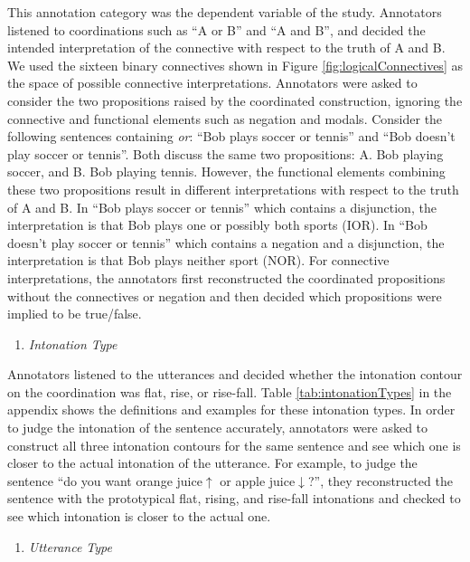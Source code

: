 \documentclass[,man,floatsintext]{apa6}
\providecommand{\tightlist}{%
  \setlength{\itemsep}{0pt}\setlength{\parskip}{0pt}}
\begin{document}
This annotation category was the dependent variable of the study. Annotators listened to coordinations such as \enquote{A or B} and \enquote{A and B}, and decided the intended interpretation of the connective with respect to the truth of A and B. We used the sixteen binary connectives shown in Figure \ref{fig:logicalConnectives} as the space of possible connective interpretations. Annotators were asked to consider the two propositions raised by the coordinated construction, ignoring the connective and functional elements such as negation and modals. Consider the following sentences containing \emph{or}: \enquote{Bob plays soccer or tennis} and \enquote{Bob doesn't play soccer or tennis}. Both discuss the same two propositions: A. Bob playing soccer, and B. Bob playing tennis. However, the functional elements combining these two propositions result in different interpretations with respect to the truth of A and B. In \enquote{Bob plays soccer or tennis} which contains a disjunction, the interpretation is that Bob plays one or possibly both sports (IOR). In \enquote{Bob doesn't play soccer or tennis} which contains a negation and a disjunction, the interpretation is that Bob plays neither sport (NOR). For connective interpretations, the annotators first reconstructed the coordinated propositions without the connectives or negation and then decided which propositions were implied to be true/false.

\begin{enumerate}
\def\labelenumi{\arabic{enumi}.}
\setcounter{enumi}{1}
\tightlist
\item
  \emph{Intonation Type}
\end{enumerate}

Annotators listened to the utterances and decided whether the intonation contour on the coordination was flat, rise, or rise-fall. Table \ref{tab:intonationTypes} in the appendix shows the definitions and examples for these intonation types. In order to judge the intonation of the sentence accurately, annotators were asked to construct all three intonation contours for the same sentence and see which one is closer to the actual intonation of the utterance. For example, to judge the sentence \enquote{do you want orange juice\(\uparrow\) or apple juice\(\downarrow\)?}, they reconstructed the sentence with the prototypical flat, rising, and rise-fall intonations and checked to see which intonation is closer to the actual one.

\begin{enumerate}
\def\labelenumi{\arabic{enumi}.}
\setcounter{enumi}{2}
\tightlist
\item
  \emph{Utterance Type}
\end{enumerate}
\end{document}
